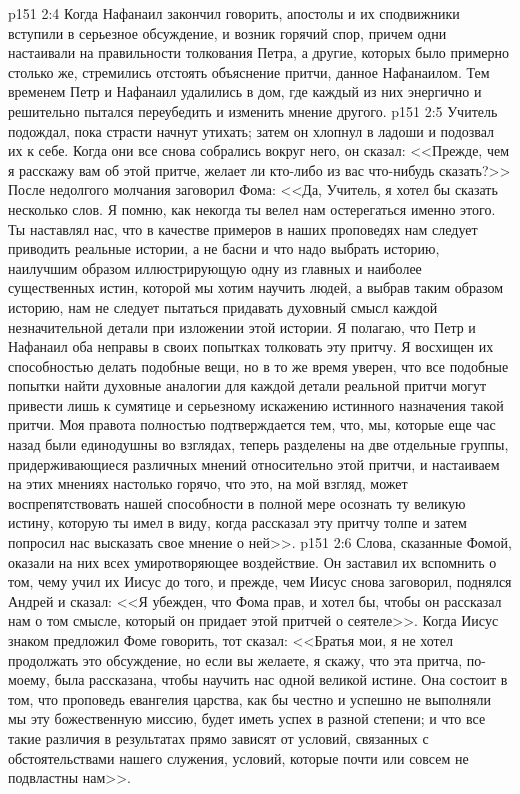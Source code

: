 \vs p151 2:4 Когда Нафанаил закончил говорить, апостолы и их сподвижники вступили в серьезное обсуждение, и возник горячий спор, причем одни настаивали на правильности толкования Петра, а другие, которых было примерно столько же, стремились отстоять объяснение притчи, данное Нафанаилом. Тем временем Петр и Нафанаил удалились в дом, где каждый из них энергично и решительно пытался переубедить и изменить мнение другого.
\vs p151 2:5 Учитель подождал, пока страсти начнут утихать; затем он хлопнул в ладоши и подозвал их к себе. Когда они все снова собрались вокруг него, он сказал: <<Прежде, чем я расскажу вам об этой притче, желает ли кто\hyp{}либо из вас что\hyp{}нибудь сказать?>> После недолгого молчания заговорил Фома: <<Да, Учитель, я хотел бы сказать несколько слов. Я помню, как некогда ты велел нам остерегаться именно этого. Ты наставлял нас, что в качестве примеров в наших проповедях нам следует приводить реальные истории, а не басни и что надо выбрать историю, наилучшим образом иллюстрирующую одну из главных и наиболее существенных истин, которой мы хотим научить людей, а выбрав таким образом историю, нам не следует пытаться придавать духовный смысл каждой незначительной детали при изложении этой истории. Я полагаю, что Петр и Нафанаил оба неправы в своих попытках толковать эту притчу. Я восхищен их способностью делать подобные вещи, но в то же время уверен, что все подобные попытки найти духовные аналогии для каждой детали реальной притчи могут привести лишь к сумятице и серьезному искажению истинного назначения такой притчи. Моя правота полностью подтверждается тем, что, мы, которые еще час назад были единодушны во взглядах, теперь разделены на две отдельные группы, придерживающиеся различных мнений относительно этой притчи, и настаиваем на этих мнениях настолько горячо, что это, на мой взгляд, может воспрепятствовать нашей способности в полной мере осознать ту великую истину, которую ты имел в виду, когда рассказал эту притчу толпе и затем попросил нас высказать свое мнение о ней>>.
\vs p151 2:6 Слова, сказанные Фомой, оказали на них всех умиротворяющее воздействие. Он заставил их вспомнить о том, чему учил их Иисус до того, и прежде, чем Иисус снова заговорил, поднялся Андрей и сказал: <<Я убежден, что Фома прав, и хотел бы, чтобы он рассказал нам о том смысле, который он придает этой притчей о сеятеле>>. Когда Иисус знаком предложил Фоме говорить, тот сказал: <<Братья мои, я не хотел продолжать это обсуждение, но если вы желаете, я скажу, что эта притча, по\hyp{}моему, была рассказана, чтобы научить нас одной великой истине. Она состоит в том, что проповедь евангелия царства, как бы честно и успешно не выполняли мы эту божественную миссию, будет иметь успех в разной степени; и что все такие различия в результатах прямо зависят от условий, связанных с обстоятельствами нашего служения, условий, которые почти или совсем не подвластны нам>>.
